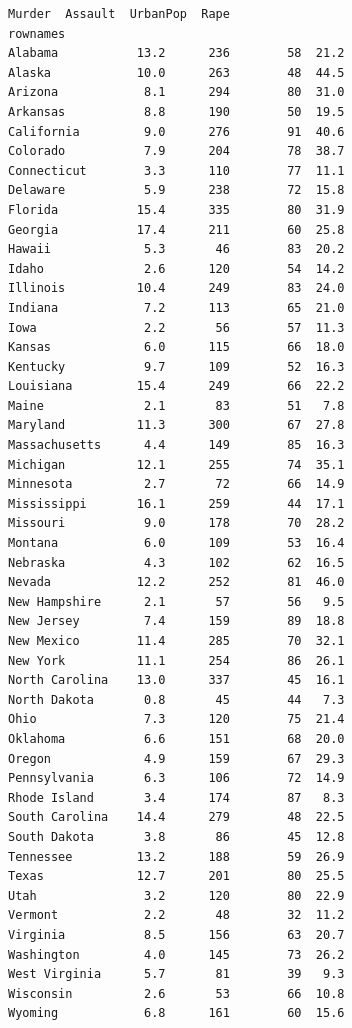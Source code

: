 \documentclass[11pt]{article}
\makeatletter
\newcommand{\boxspacing}{\kern\kvtcb@left@rule\kern\kvtcb@boxsep}
\newcommand{\prompt}[4]{
        {\ttfamily\llap{{\color{#2}[#3]:\hspace{3pt}#4}}\vspace{-\baselineskip}}
    }
\makeatother
\begin{document}
            \begin{tcolorbox}[breakable, size=fbox, boxrule=.5pt, pad at break*=1mm, opacityfill=0]
\prompt{Out}{outcolor}{3}{\boxspacing}
\begin{Verbatim}[commandchars=\\\{\}]
                Murder  Assault  UrbanPop  Rape
rownames
Alabama           13.2      236        58  21.2
Alaska            10.0      263        48  44.5
Arizona            8.1      294        80  31.0
Arkansas           8.8      190        50  19.5
California         9.0      276        91  40.6
Colorado           7.9      204        78  38.7
Connecticut        3.3      110        77  11.1
Delaware           5.9      238        72  15.8
Florida           15.4      335        80  31.9
Georgia           17.4      211        60  25.8
Hawaii             5.3       46        83  20.2
Idaho              2.6      120        54  14.2
Illinois          10.4      249        83  24.0
Indiana            7.2      113        65  21.0
Iowa               2.2       56        57  11.3
Kansas             6.0      115        66  18.0
Kentucky           9.7      109        52  16.3
Louisiana         15.4      249        66  22.2
Maine              2.1       83        51   7.8
Maryland          11.3      300        67  27.8
Massachusetts      4.4      149        85  16.3
Michigan          12.1      255        74  35.1
Minnesota          2.7       72        66  14.9
Mississippi       16.1      259        44  17.1
Missouri           9.0      178        70  28.2
Montana            6.0      109        53  16.4
Nebraska           4.3      102        62  16.5
Nevada            12.2      252        81  46.0
New Hampshire      2.1       57        56   9.5
New Jersey         7.4      159        89  18.8
New Mexico        11.4      285        70  32.1
New York          11.1      254        86  26.1
North Carolina    13.0      337        45  16.1
North Dakota       0.8       45        44   7.3
Ohio               7.3      120        75  21.4
Oklahoma           6.6      151        68  20.0
Oregon             4.9      159        67  29.3
Pennsylvania       6.3      106        72  14.9
Rhode Island       3.4      174        87   8.3
South Carolina    14.4      279        48  22.5
South Dakota       3.8       86        45  12.8
Tennessee         13.2      188        59  26.9
Texas             12.7      201        80  25.5
Utah               3.2      120        80  22.9
Vermont            2.2       48        32  11.2
Virginia           8.5      156        63  20.7
Washington         4.0      145        73  26.2
West Virginia      5.7       81        39   9.3
Wisconsin          2.6       53        66  10.8
Wyoming            6.8      161        60  15.6
\end{Verbatim}
\end{tcolorbox}
        
\end{document}
